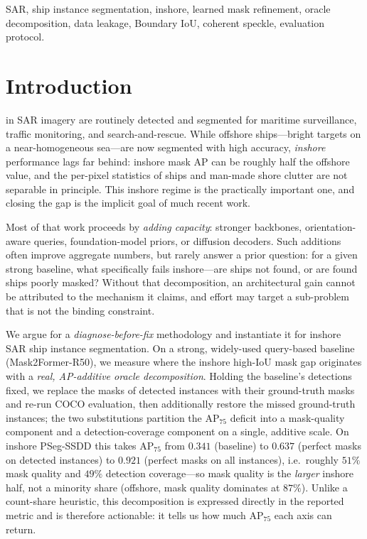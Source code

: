 \documentclass[journal]{IEEEtran}
\begin{document}
\begin{abstract}
honestly-attributed minimal remedy, a rigorous study of a statistical prior, and a reproducible evaluation protocol.
\end{abstract}

\begin{IEEEkeywords}
SAR, ship instance segmentation, inshore, learned mask refinement, oracle decomposition, data leakage, Boundary IoU, coherent speckle, evaluation protocol.
\end{IEEEkeywords}

\section{Introduction}
\label{sec:intro}
 in SAR imagery are routinely detected and segmented for maritime surveillance, traffic monitoring, and search-and-rescue. While offshore ships---bright targets on a near-homogeneous sea---are now segmented with high accuracy, \emph{inshore} performance lags far behind: inshore mask AP can be roughly half the offshore value, and the per-pixel statistics of ships and man-made shore clutter are not separable in principle. This inshore regime is the practically important one, and closing the gap is the implicit goal of much recent work.

Most of that work proceeds by \emph{adding capacity}: stronger backbones, orientation-aware queries, foundation-model priors, or diffusion decoders. Such additions often improve aggregate numbers, but rarely answer a prior question: for a given strong baseline, what specifically fails inshore---are ships not found, or are found ships poorly masked? Without that decomposition, an architectural gain cannot be attributed to the mechanism it claims, and effort may target a sub-problem that is not the binding constraint.

We argue for a \emph{diagnose-before-fix} methodology and instantiate it for inshore SAR ship instance segmentation. On a strong, widely-used query-based baseline (Mask2Former-R50), we measure where the inshore high-IoU mask gap originates with a \emph{real, AP-additive oracle decomposition}. Holding the baseline's detections fixed, we replace the masks of detected instances with their ground-truth masks and re-run COCO evaluation, then additionally restore the missed ground-truth instances; the two substitutions partition the AP$_{75}$ deficit into a mask-quality component and a detection-coverage component on a single, additive scale. On inshore PSeg-SSDD this takes AP$_{75}$ from $0.341$ (baseline) to $0.637$ (perfect masks on detected instances) to $0.921$ (perfect masks on all instances), i.e.\ roughly $51\%$ mask quality and $49\%$ detection coverage---so mask quality is the \emph{larger} inshore half, not a minority share (offshore, mask quality dominates at $87\%$). Unlike a count-share heuristic, this decomposition is expressed directly in the reported metric and is therefore actionable: it tells us how much AP$_{75}$ each axis can return.
\end{document}
